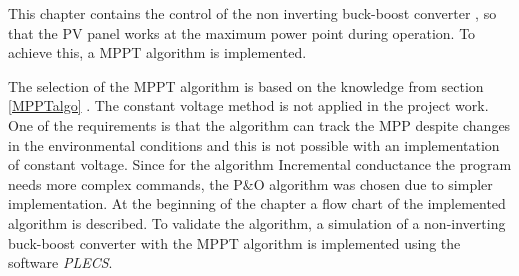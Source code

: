 This chapter contains the control of the non inverting buck-boost converter , so that the PV panel works at the maximum power point during operation. To achieve this, a MPPT algorithm is implemented.

The selection of the MPPT algorithm is based on the knowledge from section  \ref{MPPTalgo} .
The constant voltage method is not applied in the project work. One of the requirements is that the algorithm can track the MPP despite changes in the environmental conditions and this is not possible with an implementation of constant voltage. Since for the algorithm Incremental conductance the program needs more complex commands, the P\&O algorithm was chosen due to simpler implementation. %
At the beginning of the chapter a flow chart of the implemented algorithm is described. To validate the algorithm, a simulation of a non-inverting buck-boost converter with the MPPT algorithm is implemented using the software \textit{PLECS}. 
